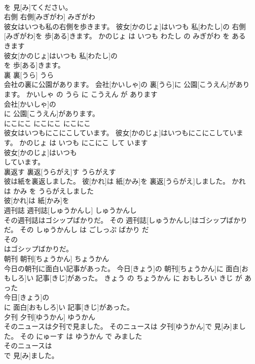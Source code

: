 \documentclass[8pt]{extreport}
\begin{document}
\begin{CJK}{UTF8}{min}
\\	を 見[み]てください。			
\\	右側	右側[みぎがわ]	みぎがわ	
\\	彼女はいつも私の右側を歩きます。	彼女[かのじょ]はいつも 私[わたし]の 右側[みぎがわ]を 歩[ある]きます。	かのじょ は いつも わたし の みぎがわ を あるきます	
\\	彼女[かのじょ]はいつも 私[わたし]の
\\	を 歩[ある]きます。			
\\	裏	裏[うら]	うら	
\\	会社の裏に公園があります。	会社[かいしゃ]の 裏[うら]に 公園[こうえん]があります。	かいしゃ の うら に こうえん が あります	
\\	会社[かいしゃ]の
\\	に 公園[こうえん]があります。			
\\	にこにこ	にこにこ	にこにこ	
\\	彼女はいつもにこにこしています。	彼女[かのじょ]はいつもにこにこしています。	かのじょ は いつも にこにこ して います	
\\	彼女[かのじょ]はいつも
\\	しています。			
\\	裏返す	裏返[うらがえ]す	うらがえす	
\\	彼は紙を裏返しました。	彼[かれ]は 紙[かみ]を 裏返[うらがえ]しました。	かれ は かみ を うらがえしました	
\\	彼[かれ]は 紙[かみ]を
\\	週刊誌	週刊誌[しゅうかんし]	しゅうかんし	
\\	その週刊誌はゴシップばかりだ。	その 週刊誌[しゅうかんし]はゴシップばかりだ。	その しゅうかんし は ごしっぷ ばかり だ	
\\	その
\\	はゴシップばかりだ。			
\\	朝刊	朝刊[ちょうかん]	ちょうかん	
\\	今日の朝刊に面白い記事があった。	今日[きょう]の 朝刊[ちょうかん]に 面白[おもしろ]い 記事[きじ]があった。	きょう の ちょうかん に おもしろい きじ が あった	
\\	今日[きょう]の
\\	に 面白[おもしろ]い 記事[きじ]があった。			
\\	夕刊	夕刊[ゆうかん]	ゆうかん	
\\	そのニュースは夕刊で見ました。	そのニュースは 夕刊[ゆうかん]で 見[み]ました。	その にゅーす は ゆうかん で みました	
\\	そのニュースは
\\	で 見[み]ました。			

\end{CJK}
\end{document}
